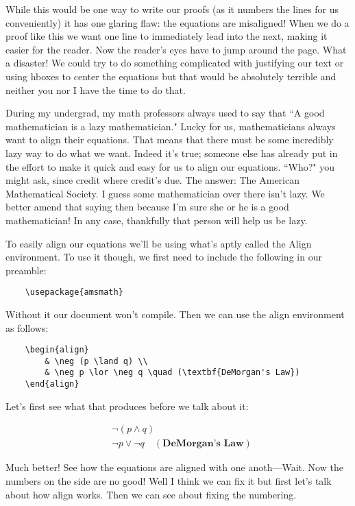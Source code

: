 \documentclass{article}
\begin{document}
While this would be one way to write our proofs (as it numbers the lines for us conveniently) it has one glaring flaw: the equations are misaligned! When we do a proof like this we want one line to immediately lead into the next, making it easier for the reader. Now the reader's eyes have to jump around the page. What a disaster! We could try to do something complicated with justifying our text or using hboxes to center the equations but that would be absolutely terrible and neither you nor I have the time to do that.

During my undergrad, my math professors always used to say that ``A good mathematician is a lazy mathematician." Lucky for us, mathematicians always want to align their equations. That means that there must be some incredibly lazy way to do what we want. Indeed it's true; someone else has already put in the effort to make it quick and easy for us to align our equations. ``Who?" you might ask, since credit where credit's due. The answer: The American Mathematical Society. I guess some mathematician over there isn't lazy. We better amend that saying then because I'm sure she or he is a good mathematician! In any case, thankfully that person will help us be lazy. 

To easily align our equations we'll be using what's aptly called the Align environment. To use it though, we first need to include the following in our preamble:

\begin{verbatim}
    \usepackage{amsmath}
\end{verbatim}

Without it our document won't compile. Then we can use the align environment as follows:

\begin{verbatim}
    \begin{align}
        & \neg (p \land q) \\
        & \neg p \lor \neg q \quad (\textbf{DeMorgan's Law})
    \end{align}
\end{verbatim}

Let's first see what that produces before we talk about it:

\begin{align}
        & \neg (p \land q) \\
        & \neg p \lor \neg q \quad (\textbf{DeMorgan's Law})
\end{align}

Much better! See how the equations are aligned with one anoth---Wait. Now the numbers on the side are no good! Well I think we can fix it but first let's talk about how align works. Then we can see about fixing the numbering.
\end{document}
